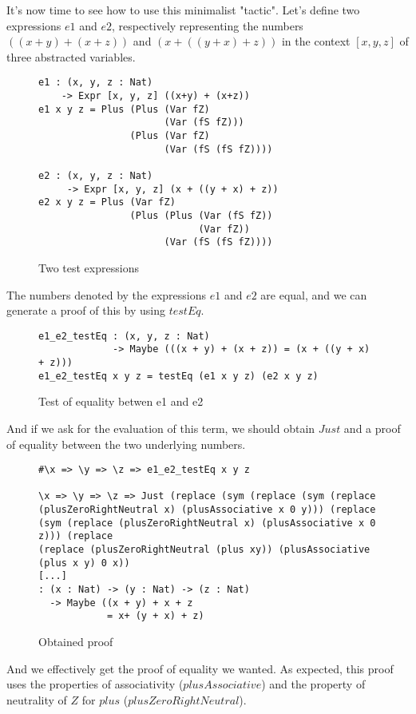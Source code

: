 It's now time to see how to use this minimalist "tactic".
Let's define two expressions $e1$ and $e2$, respectively representing the numbers $((x + y) + (x + z))$ and $(x + ((y + x) + z))$ in the context $[x, y, z]$ of three abstracted variables.


\begin{figure}[H]
\figrule
\begin{center}
\begin{verbatim}
e1 : (x, y, z : Nat) 
    -> Expr [x, y, z] ((x+y) + (x+z))
e1 x y z = Plus (Plus (Var fZ) 
                      (Var (fS fZ))) 
                (Plus (Var fZ) 
                      (Var (fS (fS fZ))))

e2 : (x, y, z : Nat) 
     -> Expr [x, y, z] (x + ((y + x) + z))
e2 x y z = Plus (Var fZ) 
                (Plus (Plus (Var (fS fZ)) 
                            (Var fZ)) 
                      (Var (fS (fS fZ))))
\end{verbatim}
\end{center}
\caption{Two test expressions}
\figrule
\end{figure}

The numbers denoted by the expressions $e1$ and $e2$ are equal, and we can generate a proof of this by using $testEq$.

\begin{figure}[H]
\figrule
\begin{center}
\begin{verbatim}
e1_e2_testEq : (x, y, z : Nat) 
             -> Maybe (((x + y) + (x + z)) = (x + ((y + x) + z)))
e1_e2_testEq x y z = testEq (e1 x y z) (e2 x y z)
\end{verbatim}
\end{center}
\caption{Test of equality betwen e1 and e2}
\figrule
\end{figure}


And if we ask for the evaluation of this term, we should obtain $Just$ and a proof of equality between the two underlying numbers.

\begin{figure}[H]
\figrule
\begin{center}
\begin{verbatim}
#\x => \y => \z => e1_e2_testEq x y z

\x => \y => \z => Just (replace (sym (replace (sym (replace 
(plusZeroRightNeutral x) (plusAssociative x 0 y))) (replace 
(sym (replace (plusZeroRightNeutral x) (plusAssociative x 0 z))) (replace 
(replace (plusZeroRightNeutral (plus xy)) (plusAssociative (plus x y) 0 x)) 
[...]
: (x : Nat) -> (y : Nat) -> (z : Nat) 
  -> Maybe ((x + y) + x + z 
            = x+ (y + x) + z)
\end{verbatim}
\end{center}
\caption{Obtained proof}
\figrule
\end{figure}

And we effectively get the proof of equality we wanted. As expected, this proof uses the properties of associativity ($plusAssociative$) and the property of neutrality of $Z$ for $plus$ ($plusZeroRightNeutral$).